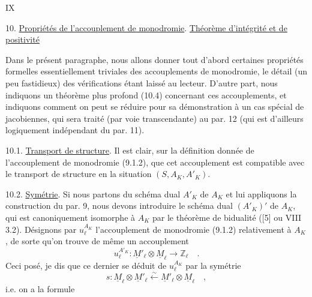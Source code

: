 \hfill IX

10. \uline{Propriétés de l'accouplement de monodromie}. \uline{Théorème d'intégrité et de positivité}

Dans le présent paragraphe, nous allons donner tout d'abord certaines propriétés formelles essentiellement triviales des accouplements de monodromie, le détail (un peu fastidieux) des vérifications étant laissé au lecteur. D'autre part, nous indiquons un théorème plus profond (10.4) concernant ces accouplements, et indiquons comment on peut se réduire pour sa démonstration à un cas spécial de jacobiennes, qui sera traité (par voie transcendante) au par. 12 (qui est d'ailleurs logiquement indépendant du par. 11).

10.1. \uline{Transport de structure}. Il est clair, sur la définition donnée de l'accouplement de monodromie (9.1.2), que cet accouplement est compatible avec le transport de structure en la situation $(S,A_K,A'_K)$.

10.2. \uline{Symétrie}. Si nous partons du schéma dual $A'_K$ de $A_K$ et lui appliquons la construction du par. 9, nous devons introduire le schéma dual $(A'_K)'$ de $A_K$, qui est canoniquement isomorphe à $A_K$ par le théorème de bidualité ([5] ou VIII 3.2). Désignons par $u_\ell^{A_K}$ l'accouplement de monodromie (9.1.2) relativement à $A_K$, de sorte qu'on trouve de même un accouplement
\[
 u_\ell^{A'_K}:\underline M'_\ell\otimes\underline M_\ell\longrightarrow\mathbb Z_\ell\quad.\tag*{(10.2.1)}
\]
Ceci posé, je dis que ce dernier se déduit de $u_\ell^{A_K}$ par la symétrie
\[
 s:\underline M_\ell\otimes\underline M'_\ell\xleftarrow{\sim}\underline M'_\ell\otimes\underline M_\ell\quad,
\]
i.e. on a la formule

